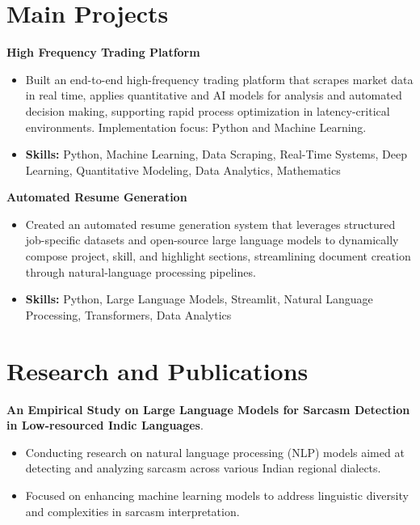 \documentclass[a4paper,11pt]{article}
\begin{document}
\section{\textbf{Main Projects}}

\vspace{1mm}
  \textbf{High Frequency Trading Platform  }
\vspace{-1.5mm} %
\begin{itemize}
  \item Built an end-to-end high-frequency trading platform that scrapes market data in real time, applies quantitative and AI models for analysis and automated decision making, supporting rapid process optimization in latency-critical environments. Implementation focus: Python and Machine Learning.
\vspace{-3mm}
  \item \textbf{Skills:} Python, Machine Learning, Data Scraping, Real-Time Systems, Deep Learning, Quantitative Modeling, Data Analytics, Mathematics
\end{itemize}


\vspace{1mm}
   \textbf{Automated Resume Generation }
\vspace{-1.5mm} %
\begin{itemize}
  \item Created an automated resume generation system that leverages structured job-specific datasets and open-source large language models to dynamically compose project, skill, and highlight sections, streamlining document creation through natural-language processing pipelines.
\vspace{-3mm}
  \item \textbf{Skills:} Python, Large Language Models, Streamlit, Natural Language Processing, Transformers, Data Analytics
\end{itemize}



\section{\textbf{Research and Publications} \hfill }
\vspace{1mm}
  \textbf{An Empirical Study on Large Language Models for Sarcasm Detection in Low-resourced Indic Languages}.
\vspace{-1mm} %
\begin{itemize}
  \item Conducting research on natural language processing (NLP) models aimed at detecting and analyzing sarcasm across various Indian regional dialects.
\vspace{-3mm}
  \item Focused on enhancing machine learning models to address linguistic diversity and complexities in sarcasm interpretation.
\end{itemize}
\end{document}
